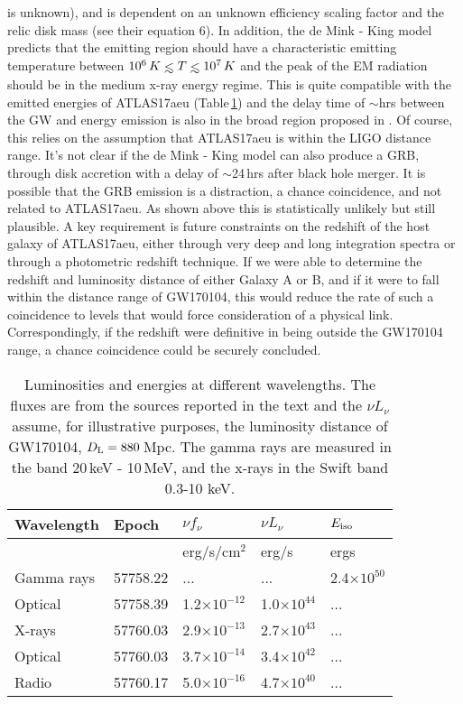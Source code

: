 \documentclass[twocolumn]{aastex61}
\def\lesssim{\mathrel{\hbox{\rlap{\hbox{\lower4pt\hbox{$\sim$}}}\hbox{$<$}}}}
\begin{document}
is unknown), and is dependent on an unknown efficiency scaling factor and the 
relic disk mass (see their equation 6). 
In addition, the 
de Mink - King model predicts that the emitting region should have a 
characteristic emitting temperature between $10^{6}\,K \lesssim T\lesssim 10^{7}\,K$
and the peak of the EM radiation should be in the medium x-ray energy 
regime. This is quite compatible with the emitted 
energies of ATLAS17aeu (Table\,\ref{tab:energy}) and the delay
time of $\sim$hrs between the GW and energy emission is also in the 
broad region proposed in \cite{2017ApJ...839L...7D}. 
Of course, this 
relies on the assumption that ATLAS17aeu is within the LIGO distance 
range. It's not clear if the de Mink - King model can also produce a GRB, 
through disk accretion 
with a delay of $\sim$24\,hrs after black hole merger. 
It is possible that the GRB emission is a distraction, a chance coincidence,
and not related to ATLAS17aeu. As shown above this is statistically 
unlikely but still plausible. 
A key requirement is future constraints on the redshift of the host galaxy of 
ATLAS17aeu, either through very deep and long integration spectra or  through a photometric redshift technique. 
If we were able to determine the redshift and luminosity distance of either Galaxy A or B, and
if it were to fall within the distance range of GW170104, this would reduce the rate of such a coincidence to levels that would force consideration of a physical link. 
Correspondingly, if the redshift were definitive in being outside the GW170104 range, a chance coincidence could be securely concluded. 


\begin{table}
\centering
\caption{Luminosities and energies at different wavelengths. The fluxes 
are from the sources reported in the text and the $\nu L_\nu$ assume, 
for illustrative purposes, the luminosity distance of  GW170104,  
$D_{\rm L} = 880$\,Mpc. The gamma rays are measured in 
the band 20\,keV - 10\,MeV, and the x-rays in the Swift band 0.3-10 keV.}
\label{tab:energy}
\begin{tabular}{lllll}\hline 
Wavelength  & Epoch    & $\nu f_\nu$   &   $\nu L_\nu$ &  $E_{\rm iso}$\\\hline 
            &          & erg/s/cm$^{2}$ &   erg/s      &   ergs \\\hline 
Gamma rays  & 57758.22 &     ...        & ...         &  2.4$\times10^{50}$ \\ 
Optical     & 57758.39 &     1.2$\times10^{-12}$ &   1.0$\times10^{44}$  &  ...       \\ 
X-rays      & 57760.03 &     2.9$\times10^{-13}$ &   2.7$\times10^{43}$  &  ...       \\ 
Optical     & 57760.03 &     3.7$\times10^{-14}$  &  3.4$\times10^{42}$  &   ...      \\
Radio       & 57760.17 &     5.0$\times10^{-16}$  &  4.7$\times10^{40}$  &  ...       \\
\hline 
\end{tabular}
\end{table}
\end{document}

